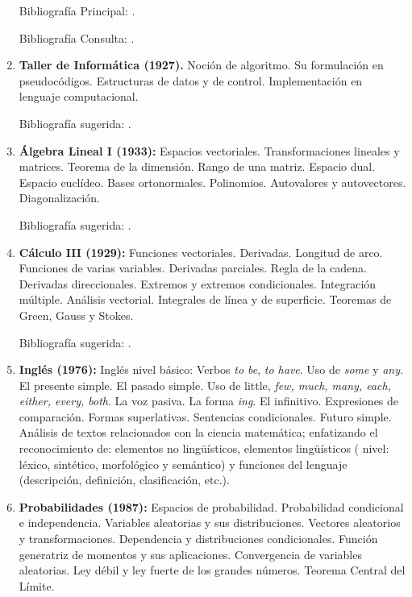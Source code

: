 \documentclass[a4paper, 12pt]{article}
\begin{document}
\begin{enumerate}
Bibliografía Principal: \cite{PeterD.Lax631,GeorgeFinlaySimmons487}.

Bibliografía Consulta: \cite{MichaelSpivak649,ErnstHairer633,DavidApplebaum639,OttoToeplitz642,DavidBressoud643,DavidM.Bressoud651,DavidM.Bressoud688}.





\item \textbf{Taller de Informática (1927).} Noción de algoritmo. Su formulación en pseudocódigos. Estructuras de datos y de control. Implementación
en lenguaje computacional.

Bibliografía sugerida: \cite{Seroul:2000,Rose:2015}.




\item \textbf{Álgebra Lineal I (1933):} Espacios vectoriales. Transformaciones
lineales y matrices. Teorema de la dimensión. Rango de una matriz.
Espacio dual. Espacio euclídeo. Bases ortonormales. Polinomios.
Autovalores y autovectores. Dia\-gonalización.

Bibliografía sugerida: \cite{hoffman, strang}.


\item \textbf{Cálculo III (1929):} Funciones vectoriales. Derivadas. Longitud de
arco. Funciones de varias variables. Derivadas parciales. Regla de
la cadena. Derivadas direccionales. Extremos y extremos
condicionales. Integración múltiple. Aná\-lisis vectorial.
Integrales de línea y de superficie. Teoremas de Green, Gauss y
Stokes.

Bibliografía sugerida: \cite{ marsdentromba,MarianoGiaquinta641,ErnstHairer633,PeterD.Lax632}.




\item\textbf{Inglés (1976):} Inglés nivel básico: Verbos \emph{to be}, \emph{to
have}. Uso de \emph{some} y \emph{any}. El presente simple. El
pasado simple. Uso de little, \emph{few, much, many, each, either,
every, both}. La voz pasiva. La forma \emph{ing}. El infinitivo.
Expresiones de comparación. Formas superlativas. Sentencias
condicionales. Futuro simple.  Análisis de textos relacionados con la
ciencia matemática; enfatizando el reconocimiento de: elementos no
ling\"{u}ísticos, elementos ling\"{u}ísticos ( nivel: léxico,
sintético, morfológico y semántico) y funciones del lenguaje
(descripción, definición, clasificación, etc.).



\item \textbf{Probabilidades (1987):} Espacios de probabilidad.  Probabilidad
condicional e independencia.  Variables aleatorias y sus distribuciones.  Vectores aleatorios y transformaciones.  Dependencia y distribuciones condicionales. Función generatriz de momentos y sus aplicaciones. Convergencia de variables aleatorias. Ley débil y ley fuerte de
los grandes números. Teorema Central del Límite. 


\end{enumerate}
\end{document}
